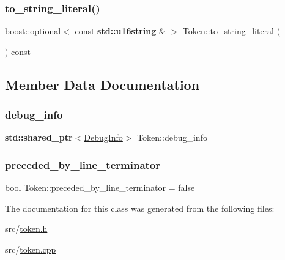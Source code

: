 \mbox{\label{class_token_a90405a7051a618d8f838bb2abee8709d}} 
\subsubsection{\texorpdfstring{to\+\_\+string\+\_\+literal()}{to\_string\_literal()}}
{\footnotesize\ttfamily boost\+::optional$<$ const \textbf{ std\+::u16string} \& $>$ Token\+::to\+\_\+string\+\_\+literal (\begin{DoxyParamCaption}{ }\end{DoxyParamCaption}) const}



\subsection{Member Data Documentation}
\mbox{\label{class_token_ae1c97965fb8e3c18c0b4e38b6d826266}} 
\subsubsection{\texorpdfstring{debug\+\_\+info}{debug\_info}}
{\footnotesize\ttfamily \textbf{ std\+::shared\+\_\+ptr}$<$\hyperlink{struct_token_1_1_debug_info}{Debug\+Info}$>$ Token\+::debug\+\_\+info}

\mbox{\label{class_token_afac81ad105ee2e0ce26fa5c9adcf8e57}} 
\subsubsection{\texorpdfstring{preceded\+\_\+by\+\_\+line\+\_\+terminator}{preceded\_by\_line\_terminator}}
{\footnotesize\ttfamily bool Token\+::preceded\+\_\+by\+\_\+line\+\_\+terminator = false}



The documentation for this class was generated from the following files\+:\begin{DoxyCompactItemize}
\item 
src/\hyperlink{token_8h}{token.\+h}\item 
src/\hyperlink{token_8cpp}{token.\+cpp}\end{DoxyCompactItemize}
